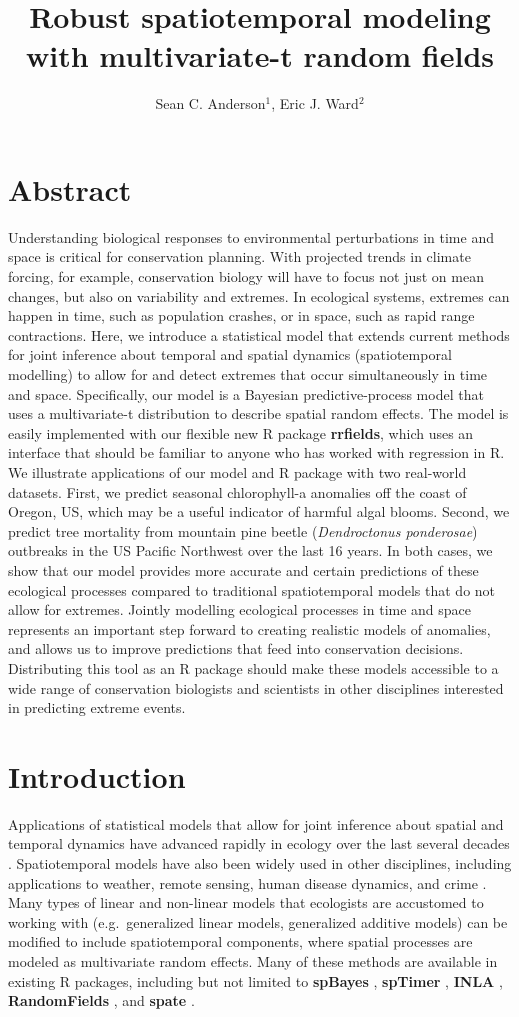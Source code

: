 \documentclass[12pt,english]{article}
\title{Robust spatiotemporal modeling with multivariate-t random fields}
\author{
Sean C. Anderson$^1$,
Eric J. Ward$^2$
}
\begin{document}
\section{Abstract}

Understanding biological responses to environmental perturbations in time and
space is critical for conservation planning. With projected trends in climate
forcing, for example, conservation biology will have to focus not just on mean
changes, but also on variability and extremes. In ecological systems, extremes
can happen in time, such as population crashes, or in space, such as rapid
range contractions. Here, we introduce a statistical model that extends current
methods for joint inference about temporal and spatial dynamics (spatiotemporal
modelling) to allow for and detect extremes that occur simultaneously in time
and space. Specifically, our model is a Bayesian predictive-process model that
uses a multivariate-t distribution to describe spatial random effects. The
model is easily implemented with our flexible new R package \textbf{rrfields},
which uses an interface that should be familiar to anyone who has worked with
regression in R. We illustrate applications of our model and R package with two
real-world datasets. First, we predict seasonal chlorophyll-a anomalies off the
coast of Oregon, US, which may be a useful indicator of harmful algal blooms.
Second, we predict tree mortality from mountain pine beetle (\emph{Dendroctonus
  ponderosae}) outbreaks in the US Pacific Northwest over the last 16 years. In
both cases, we show that our model provides more accurate and certain
predictions of these ecological processes compared to traditional
spatiotemporal models that do not allow for extremes. Jointly modelling
ecological processes in time and space represents an important step forward to
creating realistic models of anomalies, and allows us to improve predictions
that feed into conservation decisions. Distributing this tool as an R package
should make these models accessible to a wide range of conservation biologists
and scientists in other disciplines interested in predicting extreme events.

\section{Introduction}

Applications of statistical models that allow for joint inference about spatial
and temporal dynamics have advanced rapidly in ecology over the last several
decades \citep{bascompte1995, latimer2009}. Spatiotemporal models have also
been widely used in other disciplines, including applications to weather,
remote sensing, human disease dynamics, and crime \citep{cressie2011}. Many
types of linear and non-linear models that ecologists are accustomed to working
with (e.g.~generalized linear models, generalized additive models) can be
modified to include spatiotemporal components, where spatial processes are
modeled as multivariate random effects. Many of these methods are available in
existing R packages, including but not limited to \textbf{spBayes}
\citep{finley2007}, \textbf{spTimer} \citep{bakar2015}, \textbf{INLA}
\citep{rue2009}, \textbf{RandomFields} \citep{schlather2016}, and
\textbf{spate} \citep{sigrist2015}.
\end{document}
